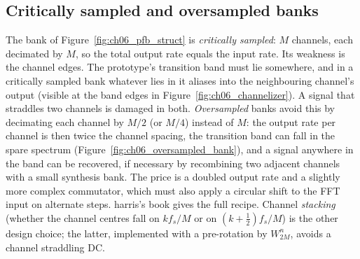 
\subsection{Critically sampled and oversampled banks}

The bank of Figure~\ref{fig:ch06_pfb_struct} is \emph{critically sampled}: $M$ channels, each
decimated by $M$, so the total output rate equals the input rate. Its weakness is the channel
edges. The prototype's transition band must lie somewhere, and in a critically sampled bank
whatever lies in it aliases into the neighbouring channel's output (visible at the band edges in
Figure~\ref{fig:ch06_channelizer}). A signal that straddles two channels is damaged in both.
\emph{Oversampled} banks avoid this by decimating each channel by $M/2$ (or $M/4$) instead of $M$:
the output rate per channel is then twice the channel spacing, the transition band can fall in the
spare spectrum (Figure~\ref{fig:ch06_oversampled_bank}), and a signal anywhere in the band can be recovered, if necessary by recombining two
adjacent channels with a small synthesis bank. The price is a doubled output rate and a slightly
more complex commutator, which must also apply a circular shift to the FFT input on alternate
steps. harris's book gives the full recipe. Channel \emph{stacking} (whether the channel centres
fall on $kf_s/M$ or on $(k+\tfrac12)f_s/M$) is the other design choice; the latter, implemented
with a pre-rotation by $W_{2M}^{n}$, avoids a channel straddling DC.



